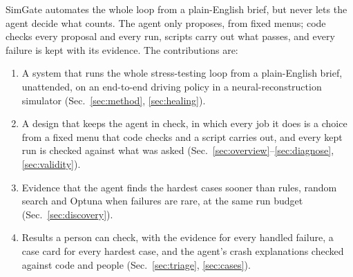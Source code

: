 \documentclass[conference]{IEEEtran}
\newcommand{\guide}[1]{}
\begin{document}
\guide{\textbf{Paragraph 2: approach and core contributions.} Open with the approach: hand the whole campaign to an AI agent but never let it decide what counts: it only proposes from fixed menus, code checks every proposal and every run, and every failure is kept with its evidence. Then list the contributions, each naming where it is described and where it is validated. (1) An agent that runs stress testing of an end-to-end driving policy end to end and unattended, in a neural-reconstruction simulator (Sec.~\ref{sec:method}; Sec.~\ref{sec:healing}). (2) An action design that makes it trustworthy: every job is a contract with a fixed menu, checked by code and carried out by scripts; the recovery menu is checked exhaustively, and every kept run is verified against its request (Sec.~\ref{sec:overview}, \ref{sec:gate}, \ref{sec:diagnose}; Sec.~\ref{sec:validity}). (3) Evidence that letting the agent choose the next tests confirms the hardest cases sooner where failures are rare, at an equal budget against rules, random search and Optuna (Sec.~\ref{sec:outer}; Sec.~\ref{sec:discovery}). (4) Results a person can check: every failure the agent handled with its evidence, a case card for every confirmed hardest case, and the agent's failure explanations checked against rules and people (Sec.~\ref{sec:healing}, \ref{sec:triage}, \ref{sec:cases}). Do not claim to be the ``first''.}

SimGate automates the whole loop from a plain-English brief, but never lets the agent decide what counts. The agent only proposes, from fixed menus; code checks every proposal and every run, scripts carry out what passes, and every failure is kept with its evidence. The contributions are:
\begin{enumerate}
\item A system that runs the whole stress-testing loop from a plain-English brief, unattended, on an end-to-end driving policy in a neural-reconstruction simulator (Sec.~\ref{sec:method}, \ref{sec:healing}).
\item A design that keeps the agent in check, in which every job it does is a choice from a fixed menu that code checks and a script carries out, and every kept run is checked against what was asked (Sec.~\ref{sec:overview}--\ref{sec:diagnose}, \ref{sec:validity}).
\item Evidence that the agent finds the hardest cases sooner than rules, random search and Optuna when failures are rare, at the same run budget (Sec.~\ref{sec:discovery}).
\item Results a person can check, with the evidence for every handled failure, a case card for every hardest case, and the agent's crash explanations checked against code and people (Sec.~\ref{sec:triage}, \ref{sec:cases}).
\end{enumerate}
\end{document}
